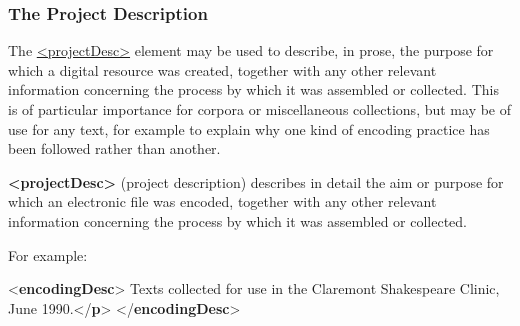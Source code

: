 \subsubsection[{The Project Description}]{The Project Description}\label{HD51}\par
The \hyperref[TEI.projectDesc]{<projectDesc>} element may be used to describe, in prose, the purpose for which a digital resource was created, together with any other relevant information concerning the process by which it was assembled or collected. This is of particular importance for corpora or miscellaneous collections, but may be of use for any text, for example to explain why one kind of encoding practice has been followed rather than another. 
\begin{sansreflist}
  
\item [\textbf{<projectDesc>}] (project description) describes in detail the aim or purpose for which an electronic file was encoded, together with any other relevant information concerning the process by which it was assembled or collected.
\end{sansreflist}
\par
For example: \par\bgroup{}\exampleFont \begin{shaded}\noindent\mbox{}{<\textbf{encodingDesc}>}\mbox{}\newline 
{}\mbox{}\newline 
\hspace*{1em}Texts collected for use in the\mbox{}\newline 
\hspace*{1em}\hspace*{1em}\hspace*{1em}\hspace*{1em} Claremont Shakespeare Clinic, June 1990.{</\textbf{p}>}\mbox{}\newline 
{}\mbox{}\newline 
{</\textbf{encodingDesc}>}\end{shaded}\egroup\par 
